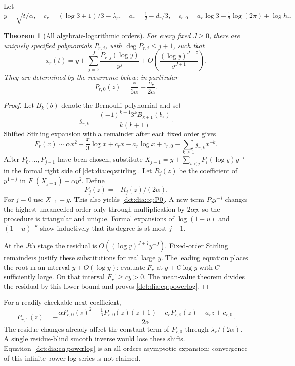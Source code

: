 \documentclass[11pt,letterpaper]{article}
\numberwithin{equation}{section}
\newtheorem{theorem}{Theorem}[section]
\theoremstyle{definition}\newtheorem{definition}[theorem]{Definition}
\theoremstyle{remark}\newtheorem{remark}[theorem]{Remark}
\begin{document}
Let
\begin{equation}\label{det:dia:eq:inverseconstants}
 y=\sqrt{t/\alpha},\quad c_r=(\log3+1)/3-\lambda_r,
 \quad a_r=\tfrac12-d_r/3,
 \quad c_{r,0}=a_r\log3-\tfrac12\log(2\pi)+\log h_r.
\end{equation}
\begin{theorem}[All algebraic-logarithmic orders]\label{det:dia:thm:powerlog}
For every fixed $J\geq0$, there are uniquely specified polynomials
$P_{r,j}$, with $\deg P_{r,j}\leq j+1$, such that
\begin{equation}\label{det:dia:eq:powerlog}
 x_r(t)=y+\sum_{j=0}^J\frac{P_{r,j}(\log y)}{y^j}
 +O\left(\frac{(\log y)^{J+2}}{y^{J+1}}\right).
\end{equation}
They are determined by the recurrence below; in particular
\begin{equation}\label{det:dia:eq:P0}
 P_{r,0}(z)=\frac{z}{6\alpha}-\frac{c_r}{2\alpha}.
\end{equation}
\end{theorem}
\begin{proof}
Let $B_k(b)$ denote the Bernoulli polynomial and set
\[
 g_{r,k}=\frac{(-1)^{k+1}3^k B_{k+1}(b_r)}{k(k+1)}.
\]
Shifted Stirling expansion with a remainder after each fixed order
\cite{dlmf} gives
\begin{equation}\label{det:dia:eq:stirling}
 F_r(x)\sim \alpha x^2-\frac{x}{3}\log x+c_rx-a_r\log x+c_{r,0}
 -\sum_{k\geq1}g_{r,k}x^{-k}.
\end{equation}
After $P_0,\ldots,P_{j-1}$ have been chosen, substitute
$X_{j-1}=y+\sum_{i<j}P_i(\log y)y^{-i}$ in the formal right side of
\eqref{det:dia:eq:stirling}. Let $R_j(z)$ be the coefficient of $y^{1-j}$ in
$F_r(X_{j-1})-\alpha y^2$. Define
\begin{equation}\label{det:dia:eq:Prec}
 P_j(z)=-R_j(z)/(2\alpha).
\end{equation}
For $j=0$ use $X_{-1}=y$. This also yields \eqref{det:dia:eq:P0}.
A new term $P_j y^{-j}$ changes the highest uncancelled order only
through multiplication by $2\alpha y$, so the procedure is triangular
and unique. Formal expansions of $\log(1+u)$ and $(1+u)^{-k}$ show
inductively that its degree is at most $j+1$.

At the $J$th stage the residual is
$O((\log y)^{J+2}y^{-J})$. Fixed-order Stirling remainders justify
these substitutions for real large $y$. The leading equation places the
root in an interval $y+O(\log y)$: evaluate $F_r$ at
$y\pm C\log y$ with $C$ sufficiently large. On that interval
$F_r'\geq c y>0$. The mean-value theorem divides the residual by this
lower bound and proves \eqref{det:dia:eq:powerlog}.
\end{proof}
For a readily checkable next coefficient,
\begin{equation}\label{det:dia:eq:P1}
 P_{r,1}(z)=-\frac{\alpha P_{r,0}(z)^2
 -\frac13P_{r,0}(z)(z+1)+c_rP_{r,0}(z)-a_rz+c_{r,0}}
 {2\alpha}.
\end{equation}
The residue changes already affect the constant term of $P_{r,0}$
through $\lambda_r/(2\alpha)$. A single residue-blind smooth inverse
would lose these shifts. Equation~\eqref{det:dia:eq:powerlog} is an all-orders
asymptotic expansion; convergence of this infinite power-log series is
not claimed.
\end{document}
